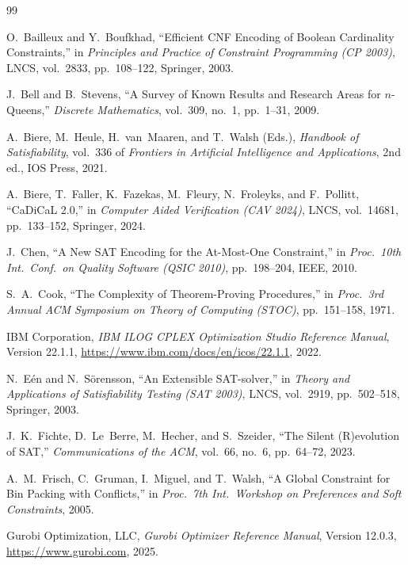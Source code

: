 \documentclass[a4paper,fleqn]{cas-sc}
\begin{document}
\begin{thebibliography}{99}
\small
\setlength{\itemsep}{1pt plus 0.5pt}
\setlength{\parskip}{0pt}

O.~Bailleux and Y.~Boufkhad,
``Efficient CNF Encoding of Boolean Cardinality Constraints,''
in \textit{Principles and Practice of Constraint Programming (CP 2003)},
LNCS, vol.~2833, pp.~108--122, Springer, 2003.

J.~Bell and B.~Stevens,
``A Survey of Known Results and Research Areas for $n$-Queens,''
\textit{Discrete Mathematics}, vol.~309, no.~1, pp.~1--31, 2009.

A.~Biere, M.~Heule, H.~van~Maaren, and T.~Walsh (Eds.),
\textit{Handbook of Satisfiability},
vol.~336 of \textit{Frontiers in Artificial Intelligence and Applications}, 2nd ed., IOS Press, 2021.

A.~Biere, T.~Faller, K.~Fazekas, M.~Fleury, N.~Froleyks, and F.~Pollitt,
``CaDiCaL 2.0,''
in \textit{Computer Aided Verification (CAV 2024)},
LNCS, vol.~14681, pp.~133--152, Springer, 2024.

J.~Chen,
``A New SAT Encoding for the At-Most-One Constraint,''
in \textit{Proc.\ 10th Int.\ Conf.\ on Quality Software (QSIC 2010)},
pp.~198--204, IEEE, 2010.

S.~A.~Cook,
``The Complexity of Theorem-Proving Procedures,''
in \textit{Proc.\ 3rd Annual ACM Symposium on Theory of Computing (STOC)},
pp.~151--158, 1971.

IBM Corporation,
\textit{IBM ILOG CPLEX Optimization Studio Reference Manual},
Version 22.1.1, \url{https://www.ibm.com/docs/en/icos/22.1.1}, 2022.

N.~E{\'e}n and N.~S{\"o}rensson,
``An Extensible SAT-solver,''
in \textit{Theory and Applications of Satisfiability Testing (SAT 2003)},
LNCS, vol.~2919, pp.~502--518, Springer, 2003.

J.~K.~Fichte, D.~Le~Berre, M.~Hecher, and S.~Szeider,
``The Silent (R)evolution of SAT,''
\textit{Communications of the ACM}, vol.~66, no.~6, pp.~64--72, 2023.

A.~M.~Frisch, C.~Gruman, I.~Miguel, and T.~Walsh,
``A Global Constraint for Bin Packing with Conflicts,''
in \textit{Proc.\ 7th Int.\ Workshop on Preferences and Soft Constraints}, 2005.

Gurobi Optimization, LLC,
\textit{Gurobi Optimizer Reference Manual},
Version 12.0.3, \url{https://www.gurobi.com}, 2025.


\end{thebibliography}
\end{document}
